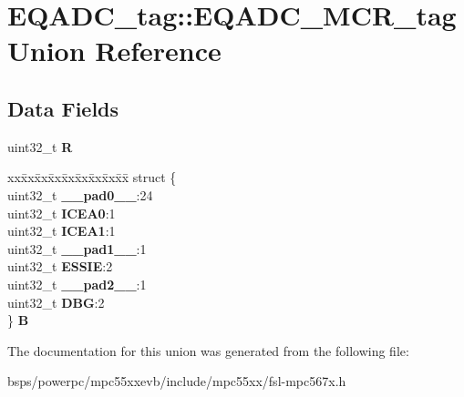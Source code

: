 \hypertarget{unionEQADC__tag_1_1EQADC__MCR__tag}{}\section{E\+Q\+A\+D\+C\+\_\+tag\+::E\+Q\+A\+D\+C\+\_\+\+M\+C\+R\+\_\+tag Union Reference}
\label{unionEQADC__tag_1_1EQADC__MCR__tag}
\subsection*{Data Fields}
\begin{DoxyCompactItemize}
\item 
\mbox{\label{unionEQADC__tag_1_1EQADC__MCR__tag_aa4f04de57e2aee00c5641d372adb75f6}} 
uint32\+\_\+t {\bfseries R}
\item 
\mbox{\label{unionEQADC__tag_1_1EQADC__MCR__tag_a3299feb04c56440a7be3f06247c5a337}} 
\begin{tabbing}
xx\=xx\=xx\=xx\=xx\=xx\=xx\=xx\=xx\=\kill
struct \{\\
\>uint32\_t {\bfseries \_\_pad0\_\_}:24\\
\>uint32\_t {\bfseries ICEA0}:1\\
\>uint32\_t {\bfseries ICEA1}:1\\
\>uint32\_t {\bfseries \_\_pad1\_\_}:1\\
\>uint32\_t {\bfseries ESSIE}:2\\
\>uint32\_t {\bfseries \_\_pad2\_\_}:1\\
\>uint32\_t {\bfseries DBG}:2\\
\} {\bfseries B}\\

\end{tabbing}\end{DoxyCompactItemize}


The documentation for this union was generated from the following file\+:\begin{DoxyCompactItemize}
\item 
bsps/powerpc/mpc55xxevb/include/mpc55xx/fsl-\/mpc567x.\+h\end{DoxyCompactItemize}
